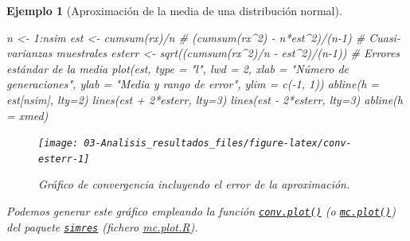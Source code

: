 \documentclass[
]{book}
\newenvironment{Shaded}{\begin{snugshade}}{\end{snugshade}}
\newcommand{\AttributeTok}[1]{\textcolor[rgb]{0.77,0.63,0.00}{#1}}
\newcommand{\CommentTok}[1]{\textcolor[rgb]{0.56,0.35,0.01}{\textit{#1}}}
\newcommand{\DecValTok}[1]{\textcolor[rgb]{0.00,0.00,0.81}{#1}}
\newcommand{\FunctionTok}[1]{\textcolor[rgb]{0.00,0.00,0.00}{#1}}
\newcommand{\NormalTok}[1]{#1}
\newcommand{\OtherTok}[1]{\textcolor[rgb]{0.56,0.35,0.01}{#1}}
\newcommand{\SpecialCharTok}[1]{\textcolor[rgb]{0.00,0.00,0.00}{#1}}
\newcommand{\StringTok}[1]{\textcolor[rgb]{0.31,0.60,0.02}{#1}}
\theoremstyle{break}
\newtheorem{example}{Ejemplo}[chapter]
\theoremstyle{nonumberplain}
\begin{document}
\begin{example}[Aproximación de la media de una distribución normal]
\begin{Shaded}
\begin{Highlighting}[]
\NormalTok{n }\OtherTok{\textless{}{-}} \DecValTok{1}\SpecialCharTok{:}\NormalTok{nsim}
\NormalTok{est }\OtherTok{\textless{}{-}} \FunctionTok{cumsum}\NormalTok{(rx)}\SpecialCharTok{/}\NormalTok{n}
\CommentTok{\# (cumsum(rx\^{}2) {-} n*est\^{}2)/(n{-}1) \# Cuasi{-}varianzas muestrales}
\NormalTok{esterr }\OtherTok{\textless{}{-}} \FunctionTok{sqrt}\NormalTok{((}\FunctionTok{cumsum}\NormalTok{(rx}\SpecialCharTok{\^{}}\DecValTok{2}\NormalTok{)}\SpecialCharTok{/}\NormalTok{n }\SpecialCharTok{{-}}\NormalTok{ est}\SpecialCharTok{\^{}}\DecValTok{2}\NormalTok{)}\SpecialCharTok{/}\NormalTok{(n}\DecValTok{{-}1}\NormalTok{)) }\CommentTok{\# Errores estándar de la media}
\FunctionTok{plot}\NormalTok{(est, }\AttributeTok{type =} \StringTok{"l"}\NormalTok{, }\AttributeTok{lwd =} \DecValTok{2}\NormalTok{, }\AttributeTok{xlab =} \StringTok{"Número de generaciones"}\NormalTok{, }
     \AttributeTok{ylab =} \StringTok{"Media y rango de error"}\NormalTok{, }\AttributeTok{ylim =} \FunctionTok{c}\NormalTok{(}\SpecialCharTok{{-}}\DecValTok{1}\NormalTok{, }\DecValTok{1}\NormalTok{))}
\FunctionTok{abline}\NormalTok{(}\AttributeTok{h =}\NormalTok{ est[nsim], }\AttributeTok{lty=}\DecValTok{2}\NormalTok{)}
\FunctionTok{lines}\NormalTok{(est }\SpecialCharTok{+} \DecValTok{2}\SpecialCharTok{*}\NormalTok{esterr, }\AttributeTok{lty=}\DecValTok{3}\NormalTok{)}
\FunctionTok{lines}\NormalTok{(est }\SpecialCharTok{{-}} \DecValTok{2}\SpecialCharTok{*}\NormalTok{esterr, }\AttributeTok{lty=}\DecValTok{3}\NormalTok{)}
\FunctionTok{abline}\NormalTok{(}\AttributeTok{h =}\NormalTok{ xmed)}
\end{Highlighting}
\end{Shaded}

\begin{figure}[!htb]

{\centering \texttt{[image: 03-Analisis\_resultados\_files/figure-latex/conv-esterr-1]} 

}

\caption{Gráfico de convergencia incluyendo el error de la aproximación.}\label{fig:conv-esterr}
\end{figure}

Podemos generar este gráfico empleando la función \href{https://rubenfcasal.github.io/simres/reference/mc.plot.html}{\texttt{conv.plot()}} (o \href{https://rubenfcasal.github.io/simres/reference/mc.plot.html}{\texttt{mc.plot()}}) del paquete \href{https://rubenfcasal.github.io/simres}{\texttt{simres}} (fichero \href{R/mc.plot.R}{\emph{mc.plot.R}}).
\end{example}
\end{document}
